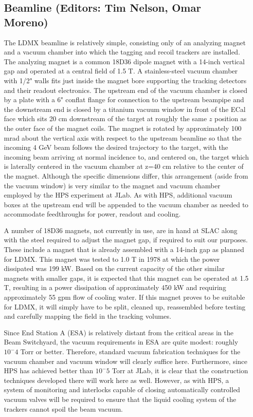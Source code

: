 \subsection{Beamline (Editors: Tim Nelson, Omar Moreno)}

The LDMX beamline is relatively simple, consisting only of an analyzing magnet
and a vacuum chamber into which the tagging and recoil trackers are installed.
The analyzing magnet is a common 18D36 dipole magnet with a 14-inch vertical 
gap and operated at a central field of 1.5 T.  A stainless-steel vacuum
chamber with 1/2" walls fits just inside the magnet bore supporting the
tracking detectors and their readout electronics. The upstream end of the
vacuum chamber is closed by a plate with a 6" conflat flange for connection to
the upstream beampipe and the downstream end is closed by a titanium vacuum
window in front of the ECal face which sits 20 cm downstream of the target
at roughly the same $z$ position as the outer face of the magnet coils.
The magnet is rotated by approximately 100 mrad about the vertical axis with
respect to the upstream beamline so that the incoming 4 GeV beam follows the
desired trajectory to the target, with the incoming beam arriving at normal
incidence to, and centered on, the target which is laterally centered in the vacuum chamber at z=40 cm relative to the center of the magnet.  Although the specific dimensions
differ, this arrangement (aside from the vacuum window) is very similar
to the magnet and vacuum chamber employed by the HPS experiment at JLab.
As with HPS, additional vacuum boxes at the upstream end will be appended to the vacuum chamber as needed to accommodate feedthroughs for power, readout and cooling.

A number of 18D36 magnets, not currently in use, are in hand at SLAC along with the steel required to adjust the magnet gap, if required to suit our purposes. These include a magnet that is already assembled with a 14-inch gap as planned for LDMX.  This magnet was tested to 1.0 T in 1978 at which the power dissipated was 199 kW.  Based on the current capacity of the other similar magnets with smaller gaps, it is expected that this magnet can be operated at 1.5 T, resulting in a power dissipation of approximately 450 kW and requiring approximately 55 gpm flow of cooling water. If this magnet proves to be suitable for LDMX, it will simply have to be split, cleaned up, reassembled before testing and carefully mapping the field in the tracking volumes.

Since End Station A (ESA) is relatively distant from the critical areas in the Beam Switchyard, the vacuum requirements in ESA are quite modest: roughly $10^-4$ Torr or better.  Therefore, standard vacuum fabrication techniques for the vacuum chamber and vacuum window will clearly suffice here.  Furthermore, since HPS has achieved better than $10^-5$ Torr at JLab, it is clear that the construction techniques developed there will work here as well. However, as with HPS, a system of monitoring and interlocks capable of closing automatically controlled vacuum valves will be required to ensure that the liquid cooling system of the trackers cannot spoil the beam vacuum.

